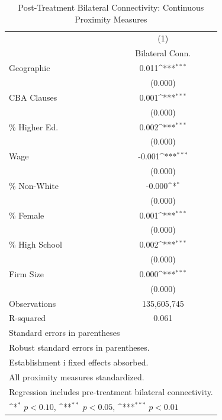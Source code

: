 \begin{table}[htbp]\centering
\def\sym#1{\ifmmode^{#1}\else\(^{#1}\)\fi}
\caption{Post-Treatment Bilateral Connectivity: Continuous Proximity Measures}
\begin{tabular}{l*{1}{c}}
\toprule
                    &\multicolumn{1}{c}{(1)}\\
                    &\multicolumn{1}{c}{Bilateral Conn.}\\
\midrule
Geographic          &       0.011\sym{***}\\
                    &     (0.000)         \\
\addlinespace
CBA Clauses         &       0.001\sym{***}\\
                    &     (0.000)         \\
\addlinespace
\% Higher Ed.       &       0.002\sym{***}\\
                    &     (0.000)         \\
\addlinespace
Wage                &      -0.001\sym{***}\\
                    &     (0.000)         \\
\addlinespace
\% Non-White        &      -0.000\sym{*}  \\
                    &     (0.000)         \\
\addlinespace
\% Female           &       0.001\sym{***}\\
                    &     (0.000)         \\
\addlinespace
\% High School      &       0.002\sym{***}\\
                    &     (0.000)         \\
\addlinespace
Firm Size           &       0.000\sym{***}\\
                    &     (0.000)         \\
\midrule
Observations        & 135,605,745         \\
R-squared           &       0.061         \\
\bottomrule
\multicolumn{2}{l}{\footnotesize Standard errors in parentheses}\\
\multicolumn{2}{l}{\footnotesize Robust standard errors in parentheses.}\\
\multicolumn{2}{l}{\footnotesize Establishment i fixed effects absorbed.}\\
\multicolumn{2}{l}{\footnotesize All proximity measures standardized.}\\
\multicolumn{2}{l}{\footnotesize Regression includes pre-treatment bilateral connectivity.}\\
\multicolumn{2}{l}{\footnotesize \sym{*} \(p<0.10\), \sym{**} \(p<0.05\), \sym{***} \(p<0.01\)}\\
\end{tabular}
\end{table}
